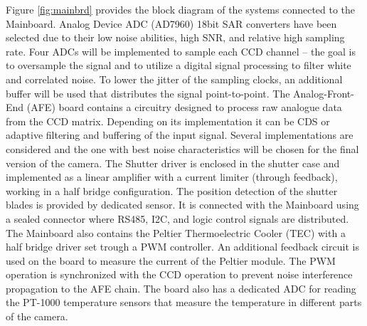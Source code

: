 Figure \ref{fig:mainbrd} provides the block diagram of the systems connected to the Mainboard. Analog Device ADC (AD7960) 18bit SAR converters have been selected due to their low noise abilities, high SNR, and relative high sampling rate. Four ADCs will be implemented to sample each CCD channel – the goal is to oversample the signal and to utilize a digital signal processing to filter white and correlated noise. To lower the jitter of the sampling clocks, an additional buffer will be used that distributes the signal point-to-point.
The Analog-Front-End (AFE) board contains a circuitry designed to process raw analogue data from the CCD matrix. Depending on its implementation it can be CDS or adaptive filtering and buffering of the input signal. Several implementations are considered and the one with best noise characteristics will be chosen for the final version of the camera.
The Shutter driver is enclosed in the shutter case and implemented as a linear amplifier with a current limiter (through feedback), working in a half bridge configuration. The position detection of the shutter blades is provided by dedicated sensor. It is connected with the Mainboard using a sealed connector where RS485, I2C, and logic control signals are distributed.
The Mainboard also contains the Peltier Thermoelectric Cooler (TEC) with a half bridge driver set trough a PWM controller. An additional feedback circuit is used on the board to measure the current of the Peltier module. The PWM operation is synchronized with the CCD operation to prevent noise interference propagation to the AFE chain.
The board also has a dedicated ADC for reading the PT-1000 temperature sensors that measure the temperature in different parts of the camera. 

